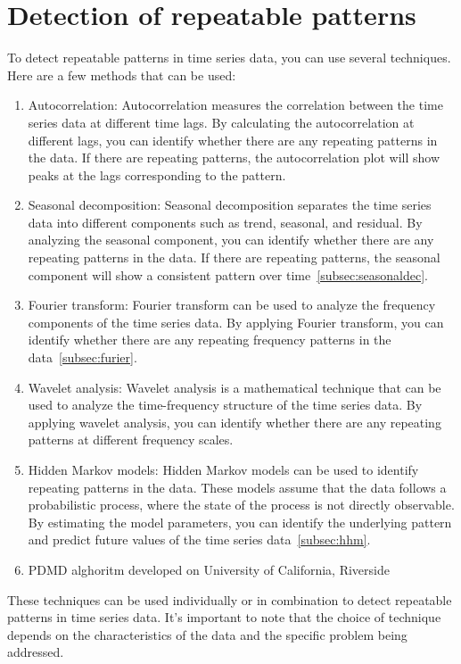     \section{Detection of repeatable patterns}
    To detect repeatable patterns in time series data, you can use several techniques. Here are a few methods that can be used:
    \begin{enumerate}
        \item Autocorrelation: Autocorrelation measures the correlation between the time series data at different time lags.
        By calculating the autocorrelation at different lags, you can identify whether there are any repeating patterns in the data.
        If there are repeating patterns, the autocorrelation plot will show peaks at the lags corresponding to the pattern.
        \item Seasonal decomposition: Seasonal decomposition separates the time series data into different components such as trend,
        seasonal, and residual. By analyzing the seasonal component, you can identify whether there are any repeating patterns in the data.
        If there are repeating patterns, the seasonal component will show a consistent pattern over time~\ref{subsec:seasonaldec}.
        \item Fourier transform: Fourier transform can be used to analyze the frequency components of the time series data. By applying
        Fourier transform, you can identify whether there are any repeating frequency patterns in the data~\ref{subsec:furier}.
        \item Wavelet analysis: Wavelet analysis is a mathematical technique that can be used to analyze the time-frequency
        structure of the time series data. By applying wavelet analysis, you can identify whether there are any repeating patterns at different
        frequency scales.
        \item Hidden Markov models: Hidden Markov models can be used to identify repeating patterns in the data.
        These models assume that the data follows a probabilistic process, where the state of the process is not directly observable.
        By estimating the model parameters, you can identify the underlying pattern and predict future values of the time series data~\ref{subsec:hhm}.
        \item PDMD alghoritm developed on University of California, Riverside
    \end{enumerate}
    These techniques can be used individually or in combination to detect repeatable patterns in time series data.
    It's important to note that the choice of technique depends on the characteristics of the data and the specific problem being addressed.
